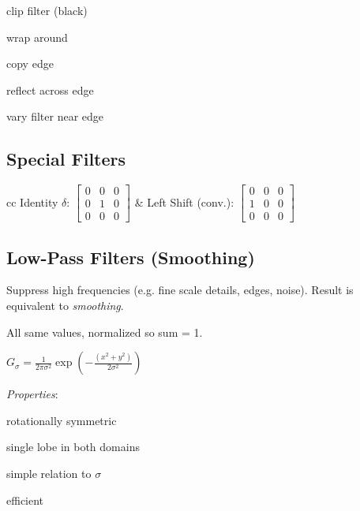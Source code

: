 \begin{definition}
  \begin{itemize*}
    \item clip filter (black)
    \item wrap around
    \item copy edge
    \item reflect across edge
    \item vary filter near edge
  \end{itemize*}
\end{definition}


\subsection{Special Filters}

\begin{tabularx}{\linewidth}{cc}
  Identity \(\delta\): \(\begin{bmatrix}
    0 & 0 & 0 \\
    0 & 1 & 0 \\
    0 & 0 & 0
  \end{bmatrix}\) & 
  Left Shift (conv.): \(\begin{bmatrix}
    0 & 0 & 0 \\
    1 & 0 & 0 \\
    0 & 0 & 0
  \end{bmatrix}\)
\end{tabularx}

\subsection{Low-Pass Filters (Smoothing)}
Suppress high frequencies (e.g. fine scale details, edges, noise).
Result is equivalent to \textit{smoothing}.

\begin{definition}
  All same values, normalized so sum = 1.
\end{definition}

\begin{definition}
  \(G_\sigma = \frac{1}{2 \pi \sigma^2} \exp\left(-\frac{(x^2 + y^2)}{2\sigma^2}\right)\)

  \textit{Properties}:
  \begin{itemize*}
    \item rotationally symmetric
    \item single lobe in both domains
    \item simple relation to \(\sigma\)
    \item efficient
  \end{itemize*}
\end{definition}

